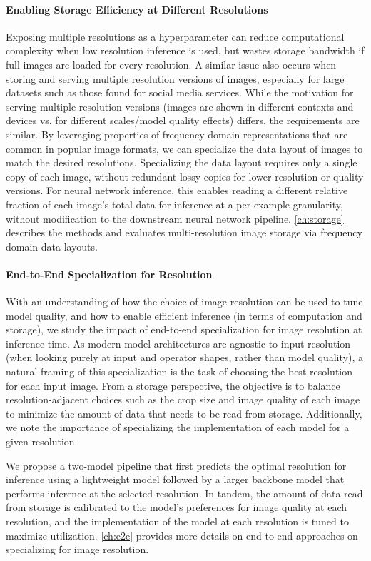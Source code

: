 \paragraph{Enabling Storage Efficiency at Different Resolutions}
Exposing multiple resolutions as a hyperparameter can reduce computational complexity when low resolution inference is used, but wastes storage bandwidth if full images are loaded for every resolution.
A similar issue also occurs when storing and serving multiple resolution versions of images, especially for large datasets such as those found for social media services.
While the motivation for serving multiple resolution versions (images are shown in different contexts and devices vs. for different scales/model quality effects) differs, the requirements are similar.
By leveraging properties of frequency domain representations that are common in popular image formats, we can specialize the data layout of images to match the desired resolutions.
Specializing the data layout requires only a single copy of each image, without redundant lossy copies for lower resolution or quality versions.
For neural network inference, this enables reading a different relative fraction of each image's total data for inference at a per-example granularity, without modification to the downstream neural network pipeline.
\autoref{ch:storage} describes the methods and evaluates multi-resolution image storage via frequency domain data layouts.


\paragraph{End-to-End Specialization for Resolution}
With an understanding of how the choice of image resolution can be used to tune model quality, and how to enable efficient inference (in terms of computation and storage), we study the impact of end-to-end specialization for image resolution at inference time.
As modern model architectures are agnostic to input resolution (when looking purely at input and operator shapes, rather than model quality), a natural framing of this specialization is the task of choosing the best resolution for each input image.
From a storage perspective, the objective is to balance resolution-adjacent choices such as the crop size and image quality of each image to minimize the amount of data that needs to be read from storage.
Additionally, we note the importance of specializing the implementation of each model for a given resolution.

We propose a two-model pipeline that first predicts the optimal resolution for inference using a lightweight model followed by a larger backbone model that performs inference at the selected resolution.
In tandem, the amount of data read from storage is calibrated to the model's preferences for image quality at each resolution, and the implementation of the model at each resolution is tuned to maximize utilization.
\autoref{ch:e2e} provides more details on end-to-end approaches on specializing for image resolution.


